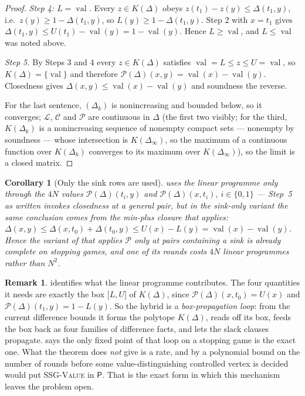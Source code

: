 \documentclass[11pt]{article}
\theoremstyle{plain}
\newtheorem{corollary}[theorem]{Corollary}
\theoremstyle{definition}
\newtheorem{remark}[theorem]{Remark}
\DeclareMathOperator{\val}{val}
\begin{document}
\begin{proof}
\emph{Step 4: $L=\val$.} Every $z\in K(\Delta)$ obeys
$z(t_1)-z(y)\le\Delta(t_1,y)$, i.e.\ $z(y)\ge1-\Delta(t_1,y)$, so
$L(y)\ge1-\Delta(t_1,y)$. Step 2 with $x=t_1$ gives
$\Delta(t_1,y)\le U(t_1)-\val(y)=1-\val(y)$. Hence $L\ge\val$, and
$L\le\val$ was noted above.

\emph{Step 5.} By Steps 3 and 4 every $z\in K(\Delta)$ satisfies
$\val=L\le z\le U=\val$, so $K(\Delta)=\{\val\}$ and therefore
$\mathcal P(\Delta)(x,y)=\val(x)-\val(y)$. Closedness gives
$\Delta(x,y)\le\val(x)-\val(y)$ and soundness the reverse.

For the last sentence, $(\Delta_k)$ is nonincreasing and bounded below, so
it converges; $\mathcal L$, $\mathcal C$ and $\mathcal P$ are continuous
in $\Delta$ (the first two visibly; for the third, $K(\Delta_k)$ is a nonincreasing
sequence of nonempty compact sets --- nonempty by soundness --- whose
intersection is $K(\Delta_\infty)$, so the maximum of a continuous
function over $K(\Delta_k)$ converges to its maximum over
$K(\Delta_\infty)$), so the limit is a closed matrix.
\end{proof}

\begin{corollary}[Only the sink rows are used]\label{cor:hybrid-sink}
 uses the linear programme only through the
$4N$ values $\mathcal P(\Delta)(t_i,y)$ and $\mathcal P(\Delta)(x,t_i)$,
$i\in\{0,1\}$ --- Step~5 as written invokes closedness at a general pair,
but in the sink-only variant the same conclusion comes from the min-plus
closure that  applies:
$\Delta(x,y)\le\Delta(x,t_0)+\Delta(t_0,y)\le U(x)-L(y)=\val(x)-\val(y)$.
Hence the variant of  that applies
$\mathcal P$ only at pairs containing a sink is already complete on
stopping games, and one of its rounds costs $4N$ linear programmes rather
than $N^{2}$.
\end{corollary}

\begin{remark}\label{rem:hybrid-box}
 identifies what the linear programme contributes.
The four quantities it needs are exactly the box
$\bigl[L,U\bigr]$ of $K(\Delta)$, since
$\mathcal P(\Delta)(x,t_0)=U(x)$ and
$\mathcal P(\Delta)(t_1,y)=1-L(y)$. So the hybrid is a
\emph{box-propagation loop}: from the current difference bounds it forms
the polytope $K(\Delta)$, reads off its box, feeds the box back as four
families of difference facts, and lets the slack clauses propagate.
 says the only fixed point of that loop on a
stopping game is the exact one. What the theorem does \emph{not} give is a
rate, and by  a polynomial bound on the number of
rounds before some value-distinguishing controlled vertex is decided would
put \textsc{SSG-Value} in $\mathsf P$. That is the exact form in which
this mechanism leaves the problem open.
\end{remark}
\end{document}
